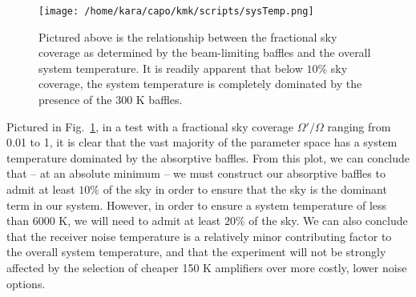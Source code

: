 \documentclass[11pt]{article}
\begin{document}
\begin{figure}
    \begin{center}
    \texttt{[image: /home/kara/capo/kmk/scripts/sysTemp.png]}
    \end{center}
    \caption{
        Pictured above is the relationship between the fractional sky coverage 
        as determined by the beam-limiting baffles and the overall system 
        temperature. It is readily apparent that below $10\%$ sky coverage, the 
        system temperature is completely dominated by the presence of the 300 K 
        baffles.
    }
    \label{fig:sys-temp}
\end{figure}

Pictured in Fig.~\ref{fig:sys-temp}, in a test with a fractional sky coverage 
$\Omega'/\Omega$ ranging from 0.01 to 1, it is clear that the vast majority of 
the parameter space has a system temperature dominated by the absorptive 
baffles. From this plot, we can conclude that -- at an absolute minimum -- we 
must construct our absorptive baffles to admit at least $10\%$ of the sky in 
order to ensure that the sky is the dominant term in our system. However, in 
order to ensure a system temperature of less than 6000 K, we will need to admit 
at least $20\%$ of the sky. We can also conclude that the receiver noise 
temperature is a relatively minor contributing factor to the overall system 
temperature, and that the experiment will not be strongly affected by the 
selection of cheaper 150 K amplifiers over more costly, lower noise options.

{}

\end{document}
